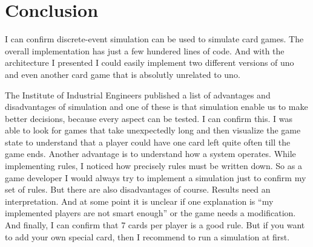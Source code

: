 
\section{Conclusion}

I can confirm discrete-event simulation can be used to simulate card games. The overall implementation has just a few hundered lines of code. And with the architecture I presented I could easily implement two different versions of uno and even another card game that is absolutly unrelated to uno. 

The Institute of Industrial Engineers published a list of advantages and disadvantages of simulation and one of these is that simulation enable us to make better decisions, because every aspect can be tested. I can confirm this. I was able to look for games that take unexpectedly long and then visualize the game state to understand that a player could have one card left quite often till the game ends.
Another advantage is to understand how a system operates. While implementing rules, I noticed how precisely rules must be written down. So as a game developer I would always try to implement a simulation just to confirm my set of rules.
But there are also disadvantages of course. Results need an interpretation. And at some point it is unclear if one explanation is “my implemented players are not smart enough” or the game needs a modification.
And finally, I can confirm that 7 cards per player is a good rule. But if you want to add your own special card, then I recommend to run a simulation at first.


